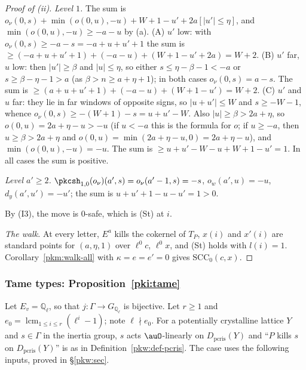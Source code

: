 \documentclass[10pt]{amsart}
\theoremstyle{definition}
\theoremstyle{remark}
\newcommand{\Q}{\mathbb Q}
\begin{document}
\begin{proof}[Proof of (ii)]
\emph{Level $1$.} The sum is $o_\nu(0,s)+\min(o(0,u),-u)+W+1-u'+2a[|u'|\le\eta]$, and
$\min(o(0,u),-u)\ge-a-u$ by (a).
(A) $u'$ low: with $o_\nu(0,s)\ge-a-s=-a+u+u'+1$ the sum is $\ge(-a+u+u'+1)+(-a-u)+(W+1-u'+2a)=W+2$.
(B) $u'$ far, $u$ low: then $|u'|\ge\beta$ and $|u|\le\eta$, so either $s\le\eta-\beta-1<-a$ or
$s\ge\beta-\eta-1>a$ (as $\beta>n\ge a+\eta+1$); in both cases $o_\nu(0,s)=a-s$. The sum is
$\ge(a+u+u'+1)+(-a-u)+(W+1-u')=W+2$.
(C) $u'$ and $u$ far: they lie in far windows of opposite signs, so $|u+u'|\le W$ and $s\ge-W-1$, whence
$o_\nu(0,s)\ge-(W+1)-s=u+u'-W$. Also $|u|\ge\beta>2a+\eta$, so $o(0,u)=2a+\eta-u>-u$ (if $u<-a$ this
is the formula for $o$; if $u\ge-a$, then $u\ge\beta>2a+\eta$ and $o(0,u)=\min(2a+\eta-u,0)=2a+\eta-u$), and $\min(o(0,u),-u)=-u$. The sum is $\ge u+u'-W-u+W+1-u'=1$.
In all cases the sum is positive.

\emph{Level $a'\ge2$.} $\pkcsh_{1,0}(o_\nu)(a',s)=o_\nu(a'-1,s)=-s$, $o_w(a',u)=-u$, $d_y(a',u')=-u'$;
the sum is $u+u'+1-u-u'=1>0$.

By (I3), the move is $0$-safe, which is (St) at $i$.

\emph{The walk.} At every letter, $E^a$ kills the cokernel of $T_P$, $x(i)$ and $x'(i)$ are standard
points for $(a,\eta,1)$ over $\ell^0c$, $\ell^0x$, and (St) holds with $l(i)=1$.
Corollary~\ref{pkm:walk-all} with $\kappa=e=e'=0$ gives $\mathrm{SCC}_0(c,x)$.
\end{proof}

\subsubsection{Tame types: Proposition~\ref{pki:tame}}\label{pkc:ss-tame}

Let $E_v=\Q_\ell$, so that $j\colon\Gamma\to G_{\Q_\ell}$ is bijective. Let $r\ge1$ and
$e_0=\operatorname{lcm}_{1\le i\le r}(\ell^i-1)$; note $\ell\nmid e_0$. For a potentially crystalline
lattice $Y$ and $s\in\Gamma$ in the inertia group, $s$ acts $\auO$-linearly on $D_{\mathrm{pcris}}(Y)$
and ``$P$ kills $s$ on $D_{\mathrm{pcris}}(Y)$'' is as in Definition~\ref{pkw:def-pcris}. The case
uses the following inputs, proved in \S\ref{pkw:sec}.
\end{document}
